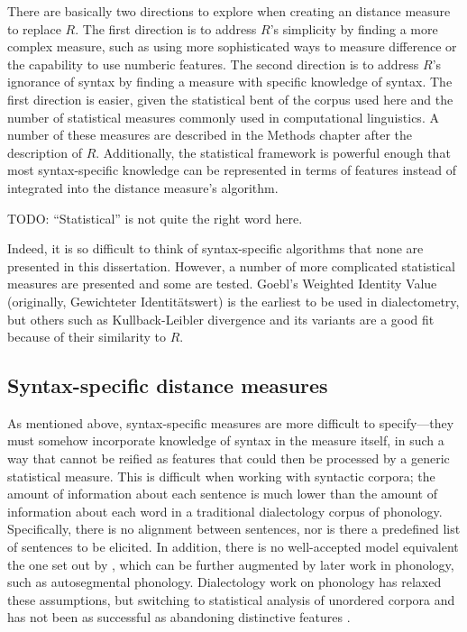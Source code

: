 There are basically two directions to explore when creating an
distance measure to replace $R$. The first direction is to address
$R$'s simplicity by finding a more complex measure, such as using more
sophisticated ways to measure difference or the capability to use
numberic features. The second direction is to address $R$'s ignorance
of syntax by finding a measure with specific knowledge of syntax. The
first direction is easier, given the statistical bent of the corpus
used here and the number of statistical measures commonly used in
computational linguistics. A number of these measures are described in
the Methods chapter after the description of $R$.  Additionally, the
statistical framework is powerful enough that most syntax-specific
knowledge can be represented in terms of features instead of
integrated into the distance measure's algorithm.

TODO: ``Statistical'' is not quite the right word here.

Indeed, it is so difficult to think of syntax-specific algorithms that
none are presented in this dissertation. However, a number of more
complicated statistical measures are presented and some are tested. Goebl's
Weighted Identity Value (originally, Gewichteter Identit\"atswert) is
the earliest to be used in dialectometry, but others such as
Kullback-Leibler divergence and its variants are a good fit because of
their similarity to $R$.

\subsection{Syntax-specific distance measures}

As mentioned above, syntax-specific measures are more difficult to
specify---they must somehow incorporate knowledge of syntax in the
measure itself, in such a way that cannot be reified as features that
could then be processed by a generic statistical measure. This is
difficult when working with syntactic corpora; the amount of
information about each sentence is much lower than the amount of
information about each word in a traditional dialectology corpus of
phonology. Specifically, there is no alignment between sentences, nor is
there a predefined list of sentences to be elicited. In addition,
there is no well-accepted model equivalent the one set out by
, which can be further augmented by later work in
phonology, such as  autosegmental
phonology. Dialectology work on phonology has relaxed these
assumptions, but switching to statistical analysis of unordered
corpora \cite{sanders06} and \cite{hinrichs07} has not
been as successful as abandoning distinctive features \cite{heeringa04}.

